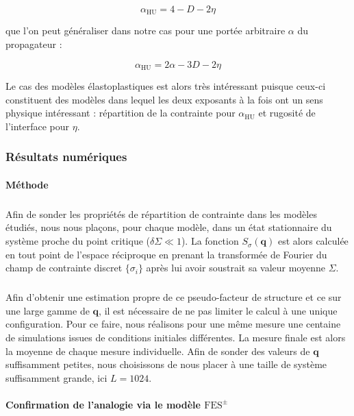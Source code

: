 \begin{equation}
	\alpha_\text{HU} = 4 - D - 2\eta
\end{equation}

\noindent que l'on peut généraliser dans notre cas pour une portée arbitraire $\alpha$ du propagateur :

\begin{equation}
	\alpha_\text{HU} = 2\alpha - 3D - 2\eta
	\label{eq:scalingHULP}
\end{equation}

\noindent Le cas des modèles élastoplastiques est alors très intéressant puisque ceux-ci constituent des modèles dans lequel les deux exposants à la fois ont un sens physique intéressant :  répartition de la contrainte pour $\alpha_\text{HU}$ et rugosité de l'interface pour $\eta$.

\subsubsection{Résultats numériques}

\label{sec:HUEPM}

\paragraph{Méthode}

\subparagraph{}Afin de sonder les propriétés de répartition de contrainte dans les modèles étudiés, nous nous plaçons, pour chaque modèle, dans un état stationnaire du système proche du point critique ($\delta\Sigma \ll 1$). La fonction $S_\sigma(\mathbf{q})$ est alors calculée en tout point de l'espace réciproque en prenant la transformée de Fourier du champ de contrainte discret $\{\sigma_i\}$ après lui avoir soustrait sa valeur moyenne $\Sigma$. 

\subparagraph{}Afin d'obtenir une estimation propre de ce pseudo-facteur de structure et ce sur une large gamme de $\mathbf{q}$, il est nécessaire de ne pas limiter le calcul à une unique configuration. Pour ce faire, nous réalisons pour une même mesure une centaine de simulations issues de conditions initiales différentes. La mesure finale est alors la moyenne de chaque mesure individuelle. Afin de sonder des valeurs de $\mathbf{q}$ suffisamment petites, nous choisissons de nous placer à une taille de système suffisamment grande, ici $L=1024$.

\paragraph{Confirmation de l'analogie via le modèle $\text{FES}^\pm$}

